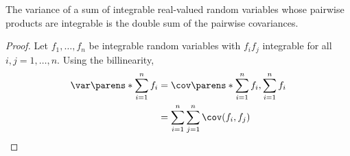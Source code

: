 \begin{prop}
The variance of a
sum of integrable
real-valued random variables
whose pairwise products
are integrable
is the double sum of
the pairwise covariances.
\begin{proof}
Let $f_1, \dots, f_n$
be integrable
random variables
with $f_if_j$ integrable
for all $i,j = 1, \dots, n$.
Using the billinearity,
\[
  \begin{aligned}
  \var\parens*{\sum_{i = 1}^{n} f_i}
  &= \cov\parens*{\sum_{i = 1}^{n} f_i, \sum_{i = 1}^{n}f_i} \\
    &= \sum_{i = 1}^{n} \sum_{j = 1}^{n} \cov(f_i, f_j)
  \end{aligned}
\]
\end{proof}
\end{prop}
\strats
